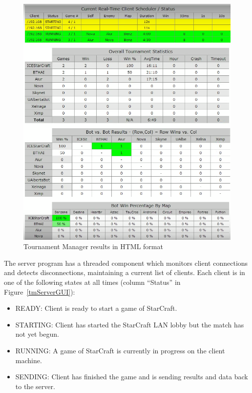 \begin{figure}[h]
  \centering
  \includegraphics[width=1\columnwidth]{fig/tournament-manager-screenshot2.png}
  \caption{Tournament Manager results in HTML format}
  \label{tmServerHTML}
\end{figure}

The server program has a threaded component which monitors client connections and detects disconnections, maintaining a current list of clients. Each client is in one of the following states at all times (column ``Status'' in Figure~\ref{tmServerGUI}):

\begin{itemize}
\item READY: Client is ready to start a game of StarCraft.
\item STARTING: Client has started the StarCraft LAN lobby but the match has not yet begun.
\item RUNNING: A game of StarCraft is currently in progress on the client machine.
\item SENDING: Client has finished the game and is sending results and data back to the server.
\end{itemize}

